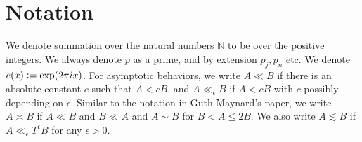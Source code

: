 \section*{Notation}
We denote summation over the natural numbers $\mathbb{N}$ to be over the positive integers. We always denote $p$ as a prime, and by extension $p_j,p_n$ etc. We denote $e(x)\mathrel{\mathop:}= \exp(2\pi i x)$. For asymptotic behaviors, we write $A\ll B$ if there is an absolute constant $c$ such that $A<cB$, and $A\ll_{\epsilon} B$ if $A<cB$ with $c$ possibly depending on $\epsilon$. Similar to the notation in Guth-Maynard's paper, we write $A\asymp B$ if $A\ll B$ and $B\ll A$ and $A\sim B$ for $B< A\leq 2B$. We also write $A\lesssim B$ if $A\ll_{\epsilon} T^\epsilon B$ for any $\epsilon>0$.
